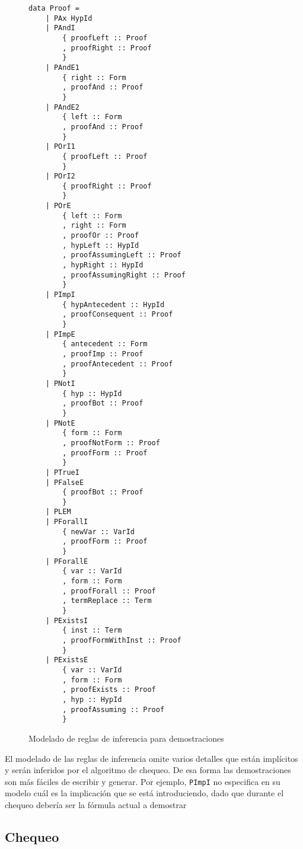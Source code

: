 \begin{figure}[H]
    
\begin{multicols}{2}
\begin{verbatim}
data Proof =
    | PAx HypId
    | PAndI
        { proofLeft :: Proof
        , proofRight :: Proof
        }
    | PAndE1
        { right :: Form
        , proofAnd :: Proof
        }
    | PAndE2
        { left :: Form
        , proofAnd :: Proof
        }
    | POrI1
        { proofLeft :: Proof
        }
    | POrI2
        { proofRight :: Proof
        }
    | POrE
        { left :: Form
        , right :: Form
        , proofOr :: Proof
        , hypLeft :: HypId
        , proofAssumingLeft :: Proof
        , hypRight :: HypId
        , proofAssumingRight :: Proof
        }
    | PImpI
        { hypAntecedent :: HypId
        , proofConsequent :: Proof
        }
    | PImpE
        { antecedent :: Form
        , proofImp :: Proof
        , proofAntecedent :: Proof
        }
    | PNotI
        { hyp :: HypId
        , proofBot :: Proof
        }
    | PNotE
        { form :: Form
        , proofNotForm :: Proof
        , proofForm :: Proof
        }
    | PTrueI
    | PFalseE
        { proofBot :: Proof
        }
    | PLEM
    | PForallI
        { newVar :: VarId
        , proofForm :: Proof
        }
    | PForallE
        { var :: VarId
        , form :: Form
        , proofForall :: Proof
        , termReplace :: Term
        }
    | PExistsI
        { inst :: Term
        , proofFormWithInst :: Proof
        }
    | PExistsE
        { var :: VarId
        , form :: Form
        , proofExists :: Proof
        , hyp :: HypId
        , proofAssuming :: Proof
        }
\end{verbatim}        
\end{multicols}
\caption{Modelado de reglas de inferencia para demostraciones}
\end{figure}

El modelado de las reglas de inferencia omite varios detalles que están
implícitos y serán inferidos por el algoritmo de chequeo. De esa forma las
demostraciones son más fáciles de escribir y generar. Por ejemplo,
\texttt{PImpI} no especifica en su modelo cuál es la implicación que se está
introduciendo, dado que durante el chequeo debería ser la fórmula actual a demostrar

\subsection{Chequeo}

